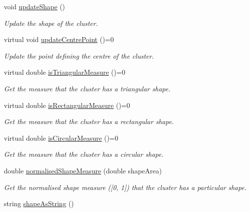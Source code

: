 \begin{DoxyCompactItemize}
void \hyperlink{classmultiscale_1_1analysis_1_1SpatialEntityPseudo3D_ad50d0866df26b63dc86853a9ab0c545d}{update\-Shape} ()
\begin{DoxyCompactList}\small\item\em Update the shape of the cluster. \end{DoxyCompactList}\item 
virtual void \hyperlink{classmultiscale_1_1analysis_1_1SpatialEntityPseudo3D_a8e81fdb72e8510d8f77ce8b518a74843}{update\-Centre\-Point} ()=0
\begin{DoxyCompactList}\small\item\em Update the point defining the centre of the cluster. \end{DoxyCompactList}\item 
virtual double \hyperlink{classmultiscale_1_1analysis_1_1SpatialEntityPseudo3D_ac0e5bce32290f2595293bd7386e04de1}{is\-Triangular\-Measure} ()=0
\begin{DoxyCompactList}\small\item\em Get the measure that the cluster has a triangular shape. \end{DoxyCompactList}\item 
virtual double \hyperlink{classmultiscale_1_1analysis_1_1SpatialEntityPseudo3D_ad2984ec212e74437f3c7f3fc18ad555c}{is\-Rectangular\-Measure} ()=0
\begin{DoxyCompactList}\small\item\em Get the measure that the cluster has a rectangular shape. \end{DoxyCompactList}\item 
virtual double \hyperlink{classmultiscale_1_1analysis_1_1SpatialEntityPseudo3D_a31066d1038679f8e9080719380403cad}{is\-Circular\-Measure} ()=0
\begin{DoxyCompactList}\small\item\em Get the measure that the cluster has a circular shape. \end{DoxyCompactList}\item 
double \hyperlink{classmultiscale_1_1analysis_1_1SpatialEntityPseudo3D_aaceb2d7941931c472a947925df1e0988}{normalised\-Shape\-Measure} (double shape\-Area)
\begin{DoxyCompactList}\small\item\em Get the normalised shape measure (\mbox{[}0, 1\mbox{]}) that the cluster has a particular shape. \end{DoxyCompactList}\item 
string \hyperlink{classmultiscale_1_1analysis_1_1SpatialEntityPseudo3D_a347c52b3cfad183a608ddbd018d8e409}{shape\-As\-String} ()

\end{DoxyCompactItemize}
